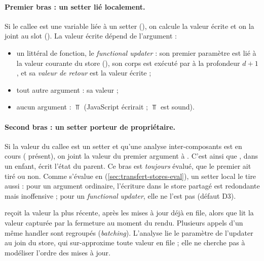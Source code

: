 
\paragraph{Premier bras : un setter lié localement.} Si le callee est une
variable liée à un setter (), on calcule la
valeur écrite et on la joint au slot (). La valeur
écrite dépend de l'argument :
\begin{itemize}
  \item un littéral de fonction, le \emph{functional updater}
     : son premier paramètre est lié à la valeur
    courante du store (), son corps est exécuté
    par  à la profondeur $d+1$, et sa \emph{valeur de
    retour} est la valeur écrite ;
  \item tout autre argument : sa valeur ;
  \item aucun argument : $\Top$ (JavaScript écrirait  ;
    $\Top$ est sound).
\end{itemize}

\paragraph{Second bras : un setter porteur de propriétaire.} Si la valeur du
callee est un setter  et qu'une analyse
inter-composants est en cours ( présent), on joint la valeur
du premier argument à . C'est ainsi que
, dans un enfant, écrit l'état du parent. Ce bras
est \emph{toujours} évalué, que le premier ait tiré ou non. Comme
 s'évalue en 
(\cref{sec:transfert-stores-eval}), un setter local le tire aussi : pour un
argument ordinaire, l'écriture dans le store partagé est redondante mais
inoffensive ; pour un \emph{functional updater}, elle ne l'est pas (défaut
D3).

\begin{react}
   reçoit la valeur la plus récente, après les
  mises à jour déjà en file, alors que  lit la valeur
  capturée par la fermeture au moment du rendu. Plusieurs appels d'un même
  handler sont regroupés (\emph{batching}). L'analyse lie le paramètre de
  l'updater au join du store, qui sur-approxime toute valeur en file ; elle
  ne cherche pas à modéliser l'ordre des mises à jour.
\end{react}

